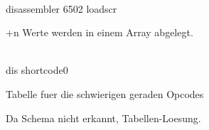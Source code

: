                                          
                                         
                                         
                                         
                                         
                                         
                                        
\\ disassembler 6502 loadscr             
                                         
                                         
                                         
                                         
                                         
                                         
                                         
+n Werte werden in einem Array           
abgelegt.                                
                                         
                                         
                                         
                                         
                                         
                                         
                                         
                                         
                                         
                                         
                                         
                                         
                                         
                                         
                                        
\\ dis shortcode0                        
                                         
Tabelle fuer die schwierigen geraden     
Opcodes                                  
                                         
Da Schema nicht erkannt,                 
Tabellen-Loesung.                        
                                         
                                         
                                         
